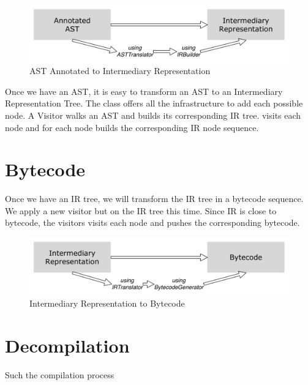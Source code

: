 \documentclass[a4paper,10pt,twoside]{book}
\begin{document}
\begin{figure}[ht]\centering
	\includegraphics[width=\linewidth]{AnnotatedASTToIR}
	\caption{AST Annotated to Intermediary Representation }
\end{figure}



Once we have an AST, it is easy to transform an AST to an Intermediary Representation Tree. The class  offers all the infrastructure to add each possible node. A Visitor walks an AST and builds its corresponding IR tree.   visits each node and for each node  builds the corresponding IR node sequence.


\section{Bytecode}
Once we have an IR tree, we will transform the IR tree in a bytecode sequence. We apply a new visitor but on the IR tree this time. Since IR is close to bytecode, the visitors visits each node and pushes the corresponding bytecode.

\begin{figure}[ht]\centering
	\includegraphics[width=\linewidth]{IRToBytecode}
	\caption{Intermediary Representation to Bytecode }
\end{figure}


\section{Decompilation}
Such the compilation process

\ifx\wholebook\relax\else
   
   
\end{document}

